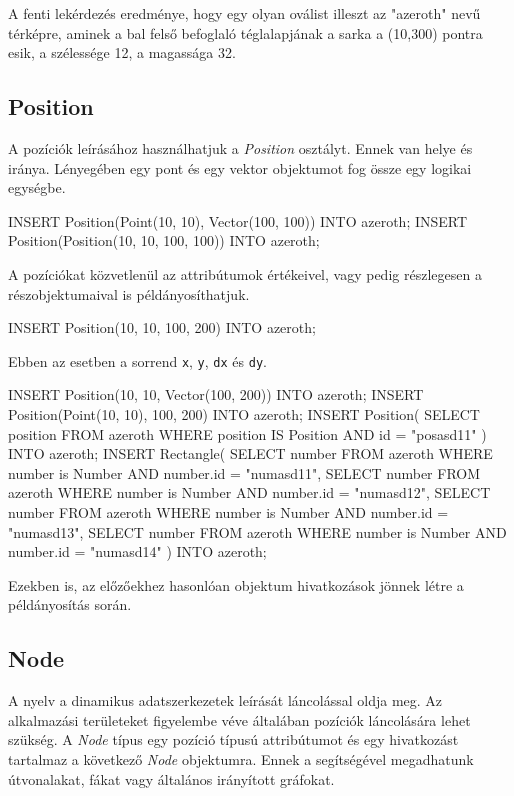 A fenti lekérdezés eredménye, hogy egy olyan oválist illeszt az "azeroth" nevű térképre, aminek a bal felső befoglaló téglalapjának a sarka a (10,300) pontra esik, a szélessége 12, a magassága 32. 

\subsection{Position}

A pozíciók leírásához használhatjuk a \textit{Position} osztályt. Ennek van helye és iránya. Lényegében egy pont és egy vektor objektumot fog össze egy logikai egységbe.

\begin{sql}
INSERT Position(Point(10, 10), Vector(100, 100)) INTO azeroth;
INSERT Position(Position(10, 10, 100, 100)) INTO azeroth;
\end{sql}

A pozíciókat közvetlenül az attribútumok értékeivel, vagy pedig részlegesen a részobjektumaival is példányosíthatjuk.

\begin{sql}
INSERT Position(10, 10, 100, 200) INTO azeroth;
\end{sql}

Ebben az esetben a sorrend \texttt{x}, \texttt{y}, \texttt{dx} és \texttt{dy}. 

\begin{sql}
INSERT Position(10, 10, Vector(100, 200)) INTO azeroth;
INSERT Position(Point(10, 10), 100, 200) INTO azeroth;
INSERT Position(
    SELECT position FROM azeroth
    WHERE position IS Position AND id = "posasd11"
) INTO azeroth;
INSERT Rectangle(
    SELECT number FROM azeroth
    WHERE number is Number AND number.id = "numasd11",
    SELECT number FROM azeroth
    WHERE number is Number AND number.id = "numasd12",
    SELECT number FROM azeroth
    WHERE number is Number AND number.id = "numasd13",
    SELECT number FROM azeroth
    WHERE number is Number AND number.id = "numasd14"
) INTO azeroth;
\end{sql}

Ezekben is, az előzőekhez hasonlóan objektum hivatkozások jönnek létre a példányosítás során.

\subsection{Node}

A nyelv a dinamikus adatszerkezetek leírását láncolással oldja meg. Az alkalmazási területeket figyelembe véve általában pozíciók láncolására lehet szükség. A \textit{Node} típus egy pozíció típusú attribútumot és egy hivatkozást tartalmaz a következő \textit{Node} objektumra. Ennek a segítségével megadhatunk útvonalakat, fákat vagy általános irányított gráfokat.


